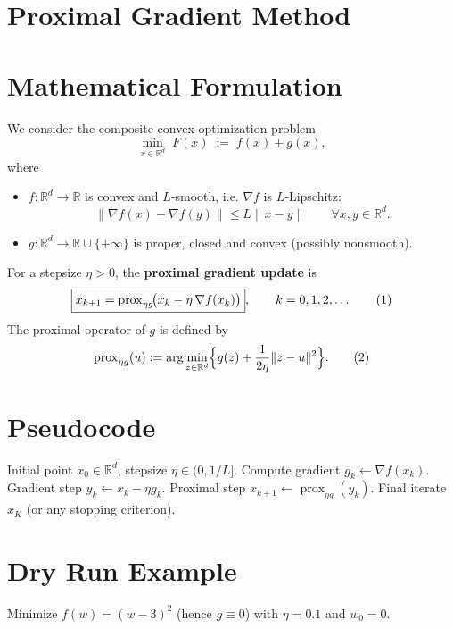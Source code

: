 \documentclass{article}
\newcommand{\prox}{\operatorname{prox}}
\newcommand{\grad}{\nabla}
\newcommand{\R}{\mathbb{R}}
\begin{document}
\section*{Proximal Gradient Method}

\section*{Mathematical Formulation}
We consider the composite convex optimization problem  
\[
\min_{x\in\R^{d}} \; F(x)\;:=\; f(x)+g(x),
\]
where  

\begin{itemize}
  \item $f:\R^{d}\!\to\!\R$ is convex and $L$‑smooth, i.e. $\grad f$ is $L$‑Lipschitz:
  \[
  \|\grad f(x)-\grad f(y)\|\le L\|x-y\|\qquad\forall x,y\in\R^{d}.
  \]
  \item $g:\R^{d}\!\to\!\R\cup\{+\infty\}$ is proper, closed and convex (possibly nonsmooth).
\end{itemize}
For a stepsize $\eta>0$, the \textbf{proximal gradient update} is  
\[
\boxed{%
x_{k+1}= \prox_{\eta g}\!\bigl(x_{k}-\eta\,\grad f(x_{k})\bigr)},
\qquad k=0,1,2,\dots
\tag{1}
\]
The proximal operator of $g$ is defined by  
\[
\prox_{\eta g}(u):=\arg\min_{z\in\R^{d}}\Bigl\{ g(z)+\frac{1}{2\eta}\|z-u\|^{2}\Bigr\}.
\tag{2}
\]

\section*{Pseudocode}
\begin{algorithm}[H]
\caption{Proximal Gradient Method}
\begin{algorithmic}[1]
\Require Initial point $x_{0}\in\R^{d}$, stepsize $\eta\in(0,1/L]$.
    \State Compute gradient $g_{k}\gets\grad f(x_{k})$.
    \State Gradient step $y_{k}\gets x_{k}-\eta g_{k}$.
    \State Proximal step $x_{k+1}\gets\prox_{\eta g}(y_{k})$.
\EndFor
\Ensure Final iterate $x_{K}$ (or any stopping criterion).
\end{algorithmic}
\end{algorithm}

\section*{Dry Run Example}
Minimize $f(w)=(w-3)^{2}$ (hence $g\equiv0$) with $\eta=0.1$ and $w_{0}=0$.
\end{document}

